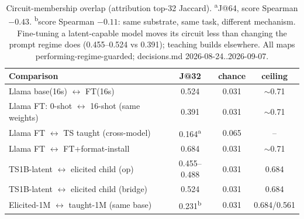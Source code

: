 \begin{table}[t]
\centering
\begin{tabular}{lccc}
\hline
Comparison & J@32 & chance & ceiling \\
\hline
Llama base(16s) $\leftrightarrow$ FT(16s) & 0.524 & 0.031 & $\sim$0.71 \\
Llama FT: 0-shot $\leftrightarrow$ 16-shot (same weights) & 0.391 & 0.031 & $\sim$0.71 \\
Llama FT $\leftrightarrow$ TS taught (cross-model) & 0.164\textsuperscript{a} & 0.065 & -- \\
Llama FT $\leftrightarrow$ FT+format-install & 0.684 & 0.031 & $\sim$0.71 \\
TS1B-latent $\leftrightarrow$ elicited child (op) & 0.455--0.488 & 0.031 & 0.684 \\
TS1B-latent $\leftrightarrow$ elicited child (bridge) & 0.524 & 0.031 & 0.684 \\
Elicited-1M $\leftrightarrow$ taught-1M (same base) & 0.231\textsuperscript{b} & 0.031 & 0.684/0.561 \\
\hline
\end{tabular}
\caption{Circuit-membership overlap (attribution top-32 Jaccard). \textsuperscript{a}J@64, score Spearman $-0.43$. \textsuperscript{b}score Spearman $-0.11$: same substrate, same task, different mechanism. Fine-tuning a latent-capable model moves its circuit less than changing the prompt regime does (0.455--0.524 vs 0.391); teaching builds elsewhere. All maps performing-regime-guarded; decisions.md 2026-08-24..2026-09-07.}
\label{tab:circuit_overlap}
\end{table}
